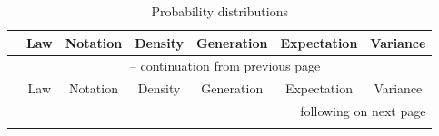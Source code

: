 \documentclass[10pt]{article}
\begin{document}
\begin{landscape}
\begin{center}
{\tiny
\setlength\LTleft{0pt}            %
\setlength\LTright{0pt}           %
\begin{longtable}{|c|c|c|c|c|c|c|}
\caption[Probability distributions]{Probability distributions}  \\

  \hline & Law & Notation & Density & Generation & Expectation & Variance \\ \hline
  \endfirsthead

  \multicolumn{7}{c}{\normalsize{\tablename\ \thetable{} -- continuation from previous page}} \\ \hline
  & Law & Notation & Density & Generation & Expectation & Variance \\ \hline
  \endhead

  \hline \multicolumn{7}{|r|}{{following on next page}} \\ \hline
  \endfoot

  \hline \hline
  \endlastfoot


\end{longtable}}
\end{center}
\end{landscape}
\end{document}
